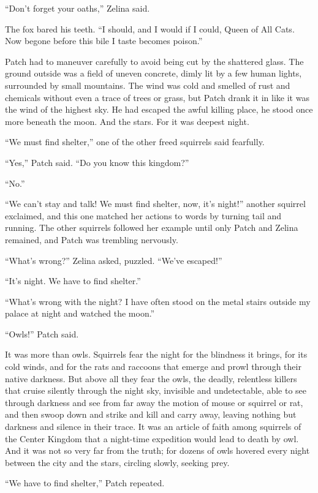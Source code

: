\documentclass[ebook,oneside,openany,17pt]{memoir}
\begin{document}
“Don’t forget your oaths,” Zelina said.

The fox bared his teeth. “I should, and I would if I could, Queen of
All Cats. Now begone before this bile I taste becomes poison.”

Patch had to maneuver carefully to avoid being cut by the shattered
glass. The ground outside was a field of uneven concrete, dimly lit by
a few human lights, surrounded by small mountains. The wind was cold
and smelled of rust and chemicals without even a trace of trees or
grass, but Patch drank it in like it was the wind of the highest
sky. He had escaped the awful killing place, he stood once more
beneath the moon. And the stars. For it was deepest night.

“We must find shelter,” one of the other freed squirrels said
fearfully.

“Yes,” Patch said. “Do you know this kingdom?”

“No.”

“We can’t stay and talk! We must find shelter, now, it’s night!”
another squirrel exclaimed, and this one matched her actions to words
by turning tail and running. The other squirrels followed her example
until only Patch and Zelina remained, and Patch was trembling
nervously.

“What’s wrong?” Zelina asked, puzzled. “We’ve escaped!”

“It’s night. We have to find shelter.”

“What’s wrong with the night? I have often stood on the metal stairs
outside my palace at night and watched the moon.”

“Owls!” Patch said.

It was more than owls. Squirrels fear the night for the blindness it
brings, for its cold winds, and for the rats and raccoons that emerge
and prowl through their native darkness. But above all they fear the
owls, the deadly, relentless killers that cruise silently through the
night sky, invisible and undetectable, able to see through darkness
and see from far away the motion of mouse or squirrel or rat, and then
swoop down and strike and kill and carry away, leaving nothing but
darkness and silence in their trace. It was an article of faith among
squirrels of the Center Kingdom that a night-time expedition would
lead to death by owl. And it was not so very far from the truth; for
dozens of owls hovered every night between the city and the stars,
circling slowly, seeking prey.

“We have to find shelter,” Patch repeated.
\end{document}

